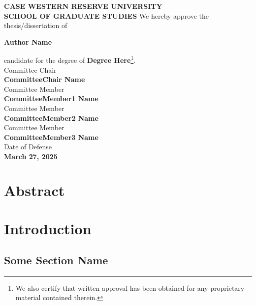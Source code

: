 \documentclass[12pt, oneside]{book}
\begin{document}
\newpage
\begin{center}
    \textbf{\MakeUppercase{Case Western Reserve University}}\\
    \textbf{\MakeUppercase{School of Graduate Studies}}
    \vfill
    We hereby approve the thesis/dissertation of \par
    \textbf{Author Name} \par
    candidate for the degree of \textbf{Degree Here}\footnote{We also certify that written approval has been obtained for any proprietary material contained therein.}.\\
    \vfill
    Committee Chair \\
    \textbf{CommitteeChair Name}\\
    \vfill
    Committee Member \\
    \textbf{CommitteeMember1 Name}\\
    \vfill
    Committee Member \\
    \textbf{CommitteeMember2 Name}\\
    \vfill
    Committee Member \\
    \textbf{CommitteeMember3 Name}\\
    \vfill
    Date of Defense \\
    \textbf{March 27, 2025}
\end{center}







\tableofcontents


\chapter*{Abstract}
\thispagestyle{plain}

\lipsum[1-3]
\thispagestyle{plain}



\chapter{Introduction}


\lipsum[3]

\section{Some Section Name}
\end{document}
